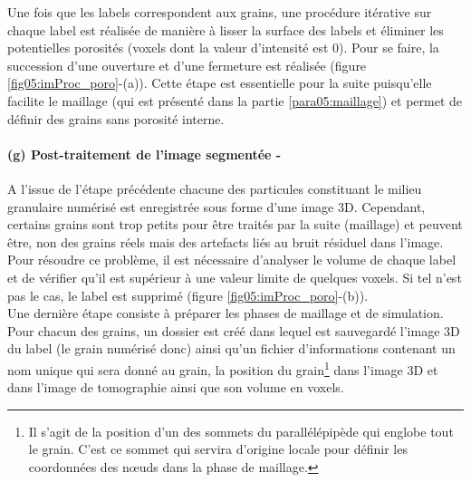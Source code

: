 		Une fois que les labels correspondent aux grains, une procédure itérative sur chaque label est réalisée de manière à lisser la surface des labels et éliminer les potentielles porosités (voxels dont la valeur d'intensité est \num{0}). Pour se faire, la succession d'une ouverture et d'une fermeture est réalisée (figure \ref{fig05:imProc_poro}-(a)). Cette étape est essentielle pour la suite puisqu'elle facilite le maillage (qui est présenté dans la partie \ref{para05:maillage}) et permet de définir des grains sans porosité interne.
	\paragraph{(g) Post-traitement de l'image segmentée -}\label{para05:post_segm}
		A l'issue de l'étape précédente chacune des particules constituant le milieu granulaire numérisé est enregistrée sous forme d'une image 3D. Cependant, certains grains sont trop petits pour être traités par la suite (maillage) et peuvent être, non des grains réels mais des artefacts liés au bruit résiduel dans l'image. Pour résoudre ce problème, il est nécessaire d'analyser le volume de chaque label et de vérifier qu'il est supérieur à une valeur limite de quelques voxels. Si tel n'est pas le cas, le label est supprimé (figure \ref{fig05:imProc_poro}-(b)).
		\\Une dernière étape consiste à préparer les phases de maillage et de simulation. Pour chacun des grains, un dossier est créé dans lequel est sauvegardé l'image 3D du label (le grain numérisé donc) ainsi qu'un fichier d'informations contenant un nom unique qui sera donné au grain, la position du grain\footnote{Il s'agit de la position d'un des sommets du parallélépipède qui englobe tout le grain. C'est ce sommet qui servira d'origine locale pour définir les coordonnées des n\oe{}uds dans la phase de maillage.} dans l'image 3D et dans l'image de tomographie ainsi que son volume en voxels.

